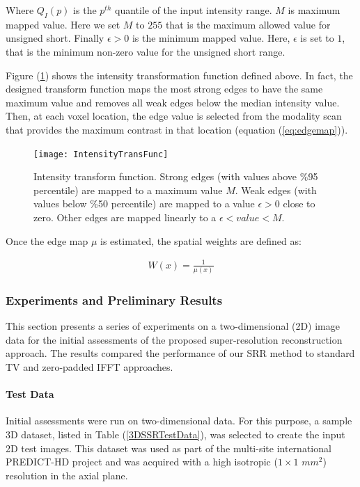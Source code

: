 Where $Q_I(p)$ is the $p^{th}$ quantile of the input intensity range. 
$M$ is maximum mapped value. Here we set $M$ to $255$ that is the maximum allowed value for unsigned short.
Finally $\epsilon > 0$ is the minimum mapped value. Here, $\epsilon$ is set to $1$, that is the minimum non-zero value for the unsigned short range.

Figure (\ref{IntensityTransFunc}) shows the intensity transformation function defined above.
In fact, the designed transform function maps the most strong edges to have the same maximum value and removes all weak edges below the median intensity value.
Then, at each voxel location, the edge value is selected from the modality scan that provides the maximum contrast in that location (equation (\ref{eq:edgemap})).

\begin{figure}
\centering
\texttt{[image: IntensityTransFunc]}\
\centering
\caption{Intensity transform function. Strong edges (with values above \%95 percentile) are mapped to a maximum value $M$. Weak edges (with values below \%50 percentile) are mapped to a value $\epsilon > 0$ close to zero. Other edges are mapped linearly to a $\epsilon < value < M$.}
\label{IntensityTransFunc}
\end{figure}

Once the edge map $\mu$ is estimated, the spatial weights are defined as:

\begin{equation}
\label{eq:spatialWeights}
\begin{gathered}
W(x) = \frac{1}{\mu (x)}
\end{gathered}
\end{equation}

\subsubsection{Experiments and Preliminary Results}
This section presents a series of experiments on a two-dimensional (2D) image data for the initial assessments of the proposed super-resolution reconstruction approach.
The results compared the performance of our SRR method to standard TV and zero-padded IFFT approaches.

\paragraph{Test Data}
Initial assessments were run on two-dimensional data. For this purpose, a sample 3D dataset, listed in Table (\ref{3DSSRTestData}), was selected to create the input 2D test images. This dataset was used as part of the multi-site international PREDICT-HD project and was acquired with a high isotropic ($1 \times 1$ $mm^2$) resolution in the axial plane.

